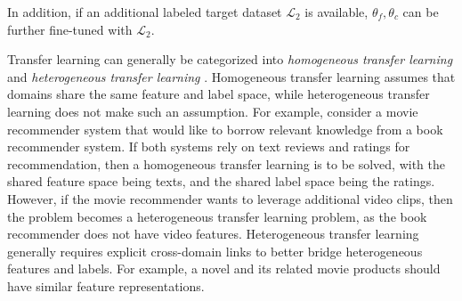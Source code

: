 \documentclass[11pt]{article}
\begin{document}
In addition, if an additional labeled target dataset $\mathcal{L}_2$ is available, $\theta_f, \theta_c$ can be further fine-tuned with $\mathcal{L}_2$. 

Transfer learning can generally be categorized into \textit{homogeneous transfer learning} and \textit{heterogeneous transfer learning} \cite{pan2010survey}. Homogeneous transfer learning assumes that domains share the same feature and label space, while heterogeneous transfer learning does not make such an assumption. For example, consider a movie recommender system that would like to borrow relevant knowledge from a book recommender system. If both systems rely on text reviews and ratings for recommendation, then a homogeneous transfer learning is to be solved, with the shared feature space being texts, and the shared label space being the ratings. However, if the movie recommender wants to leverage additional video clips, then the problem becomes a heterogeneous transfer learning problem, as the book recommender does not have video features. Heterogeneous transfer learning generally requires explicit cross-domain links to better bridge heterogeneous features and labels. For example, a novel and its related movie products should have similar feature representations. 
\end{document}
